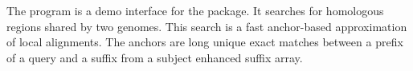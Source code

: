The program  is a demo interface for the  package.
It searches for homologous regions shared by two genomes. This search
is a fast anchor-based approximation of local alignments. The anchors
are long unique exact matches between a prefix of a query and a suffix
from a subject enhanced suffix array.
